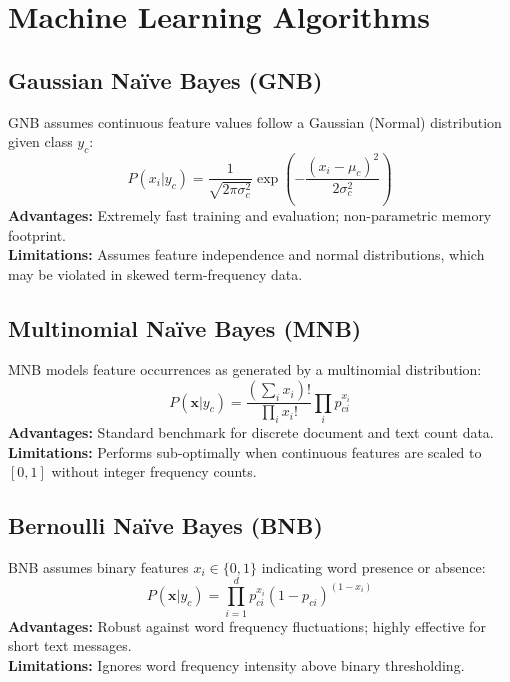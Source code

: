 \documentclass[12pt,a4paper]{article}
\begin{document}
\section{Machine Learning Algorithms}

\subsection{Gaussian Na\"ive Bayes (GNB)}
GNB assumes continuous feature values follow a Gaussian (Normal) distribution given class $y_c$:
\begin{equation}
    P(x_i | y_c) = \frac{1}{\sqrt{2\pi\sigma_c^2}} \exp\left(-\frac{(x_i - \mu_c)^2}{2\sigma_c^2}\right)
\end{equation}
\textbf{Advantages:} Extremely fast training and evaluation; non-parametric memory footprint.\\
\textbf{Limitations:} Assumes feature independence and normal distributions, which may be violated in skewed term-frequency data.

\subsection{Multinomial Na\"ive Bayes (MNB)}
MNB models feature occurrences as generated by a multinomial distribution:
\begin{equation}
    P(\mathbf{x} | y_c) = \frac{(\sum_i x_i)!}{\prod_i x_i!} \prod_i p_{ci}^{x_i}
\end{equation}
\textbf{Advantages:} Standard benchmark for discrete document and text count data.\\
\textbf{Limitations:} Performs sub-optimally when continuous features are scaled to $[0, 1]$ without integer frequency counts.

\subsection{Bernoulli Na\"ive Bayes (BNB)}
BNB assumes binary features $x_i \in \{0, 1\}$ indicating word presence or absence:
\begin{equation}
    P(\mathbf{x} | y_c) = \prod_{i=1}^d p_{ci}^{x_i} (1 - p_{ci})^{(1 - x_i)}
\end{equation}
\textbf{Advantages:} Robust against word frequency fluctuations; highly effective for short text messages.\\
\textbf{Limitations:} Ignores word frequency intensity above binary thresholding.
\end{document}
